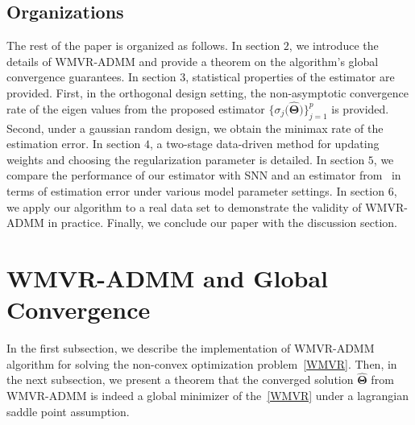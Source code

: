 \documentclass[alpha-refs]{wiley-article}
\begin{document}
\subsection{Organizations}
The rest of the paper is organized as follows.
In section $2$, we introduce the details of WMVR-ADMM and provide a theorem on the algorithm's global convergence guarantees.
In section $3$, statistical properties of the estimator are provided.
First, in the orthogonal design setting, the non-asymptotic convergence rate of the eigen values from the proposed estimator  $\{\sigma_{j}\big(\widehat{\boldsymbol{\Theta}}\big)\}_{j=1}^{p}$ is provided.
Second, under a gaussian random design, we obtain the minimax rate of the estimation error.
In section $4$, a two-stage data-driven method for updating weights and choosing the regularization parameter is detailed.
In section $5$, we compare the performance of our estimator with SNN and an estimator from~\citet{chen2013reduced} in terms of estimation error under various model parameter settings.
In section $6$, we apply our algorithm to a real data set to demonstrate the validity of WMVR-ADMM in practice.
Finally, we conclude our paper with the discussion section.

\section{WMVR-ADMM and Global Convergence}
In the first subsection, we describe the implementation of WMVR-ADMM algorithm for solving the non-convex optimization  problem~\eqref{WMVR}.
Then, in the next subsection, we present a theorem that the converged solution $\widehat{\boldsymbol{\Theta}}$ from WMVR-ADMM is indeed a global minimizer of the~\eqref{WMVR} under a lagrangian saddle point assumption.
\end{document}
